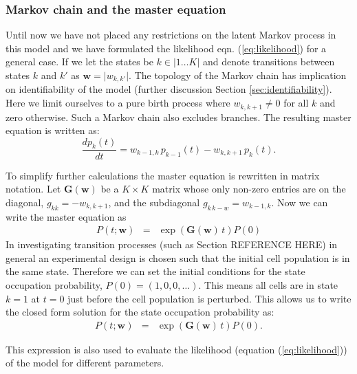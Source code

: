 \subsubsection{Markov chain and the master equation}
\label{sec:markov-chain-master}

Until now we have not placed any restrictions on the latent Markov process in this model and we have formulated the
likelihood eqn. (\ref{eq:likelihood}) for a general case. If we let the states be $k \in \lvert 1 \ldots K \rvert$ and denote transitions between states $k$ and $k'$ as $\mathbf{w} = \lvert w_{k,k'} \rvert$. 
The topology of the Markov chain has implication on identifiability of the model (further discussion Section \ref{sec:identifiability}). Here we limit ourselves to a pure birth process where $w_{k,k+1} \ne 0$ for all $k$ and zero otherwise. Such a Markov chain also excludes branches. The resulting master equation is written as:
\begin{equation}
  \label{eq:master}
  \frac{d p_k(t)}{dt} = w_{k-1,k}\, p_{k-1}(t) - w_{k,k+1}\, p_k(t).
\end{equation}

To simplify further calculations the master equation is rewritten in matrix notation. Let $\mathbf{G}(\mathbf{w})$ be a $K \times K$ matrix whose only non-zero entries are on the diagonal, $g_{kk}=-w_{k,k+1}$, and the subdiagonal $ g_{k\,k-w}=w_{k-1,k}$. Now we can write the master equation as
\begin{eqnarray}
  \label{eq:masterMat}
  P(t; \mathbf{w}) &=& \exp{\left(\mathbf{G}(\mathbf{w})\,t \right) } {P}(0)
\end{eqnarray} %
In investigating transition processes (such as Section REFERENCE HERE) in general an experimental design is chosen such that the initial cell population is in the same state. Therefore we can set the initial conditions for the state occupation probability, $P(0) = (1, 0 , 0, \ldots)$. This means all cells are in state $k=1$ at $t=0$ just before the cell population is perturbed. This allows us to write the closed form solution for the state occupation probability as:
\begin{eqnarray}
  \label{eq:state-occ}
  P(t; \mathbf{w}) &= & \exp{\left(\mathbf{G}(\mathbf{w})\,t \right) } {P}(0).
\end{eqnarray}

This expression is also used to evaluate the likelihood (equation (\ref{eq:likelihood})) of the model for different parameters.

